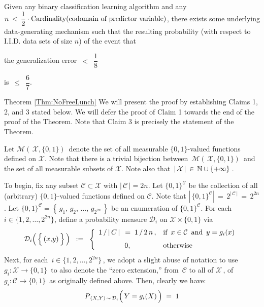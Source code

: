 
\newpage
\begin{remark}
\mbox{}\vskip 0.1cm
\noindent
Given any binary classification learning algorithm and
any \,$n \,<\, \dfrac{1}{2}\cdot\textnormal{Cardinality}(\textnormal{codomain of predictor variable})$,
there exists some underlying data-generating mechanism such that
the resulting probability (with respect to I.I.D. data sets of size $n$) of the event that
\begin{center}
the generalization error \,$<$\, $\dfrac{1}{8}$
\end{center}
is \,$\leq$\, $\dfrac{6}{7}$.
\end{remark}


\vskip 1.0cm
\proofof Theorem \ref{Thm:NoFreeLunch}
\vskip 0.3cm
\noindent
We will present the proof by establishing Claims 1, 2, and 3 stated below.
We will defer the proof of Claim 1 towards the end of the proof of the Theorem.
Note that Claim 3 is precisely the statement of the Theorem.

\vskip 0.5cm
\noindent
Let $\mathcal{M}\!\left(\,\mathcal{X},\{0,1\}\right)$\, denote the set of all measurable $\{0,1\}$-valued
functions defined on $\mathcal{X}$.
Note that there is a trivial bijection between \,$\mathcal{M}\!\left(\,\mathcal{X},\{0,1\}\right)$\, and
the set of all measurable subsets of $\mathcal{X}$.
Note also that \,$\vert\,\mathcal{X}\,\vert \,\in\, \mathbb{N}\cup\{+\infty\}$\,.

\vskip 0.5cm
\noindent
To begin, fix any subset $\mathcal{C} \subset \mathcal{X}$ with $\vert\,\mathcal{C}\,\vert = 2n$.
Let $\{0,1\}^{\mathcal{C}}$ be the collection of all (arbitrary) $\{0,1\}$-valued functions defined on $\mathcal{C}$.
Note that $\left\vert\,\{0,1\}^{\mathcal{C}}\right\vert \,=\, 2^{\vert\,\mathcal{C}\,\vert} \, = \, 2^{2n}$.
Let $\{0,1\}^{\mathcal{C}} = \left\{\,g_{1},\, g_{2},\, \ldots,\, g_{2^{2n}}\,\right\}$ be an enumeration of $\{0,1\}^{\mathcal{C}}$.
For each $i \in \{1,2,\ldots,2^{2n}\}$, define a probability measure $\mathcal{D}_{i}$ on $\mathcal{X} \times \{0,1\}$ via
\begin{equation*}
\mathcal{D}_{i}\!\left(\,\left\{\,(x\overset{{\color{white}\vert}}{,}y)\,\right\}\,\right)
\;\; := \;\;
	\left\{\begin{array}{cl}
		1\,/\,\vert\,C\,\vert\, \;=\; 1\,/\,2\,n\,, & \textnormal{if \,$x \in \mathcal{C}$\, and \,$y = g_{i}(x)$} \\
		\overset{{\color{white}\vert}}{0}, & \textnormal{otherwise}
		\end{array}\right.
\end{equation*}
Next, for each \,$i \in \{1,2,\ldots,2^{2n}\}$\,, we adopt a slight abuse of notation to use
\,$g_{i} : \mathcal{X} \longrightarrow \{0,1\}$\, to also denote the ``zero extension,''
from \,$\mathcal{C}$ to all of $\mathcal{X}$\,, of \,$g_{i} : \mathcal{C} \longrightarrow \{0,1\}$\,
as originally defined above.
Then, clearly we have:
\begin{equation*}
P_{\,(X,Y)\,\sim\,\mathcal{D}_{i}}\!\left(\,Y \overset{{\color{white}-}}{=} g_{i}(X)\,\right) \; = \; 1
\end{equation*}


